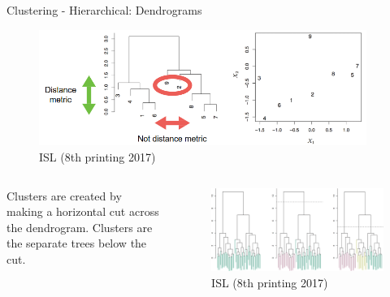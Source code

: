 \begin{frame}[allowframebreaks]{Clustering - Hierarchical: Dendrograms}
\begin{block}{}
    \vspace{1.5em}

    \begin{figure}
        \centering
        \includegraphics[width=0.95\textwidth,height=0.7\textheight,keepaspectratio]{images/dul/hierarchical/dendograms-distance-metric.png}
        \caption{ISL (8th printing 2017)}
    \end{figure}
\end{block}

\framebreak

\begin{columns}
    \begin{column}{0.45\textwidth}
        Clusters are created by  making a horizontal cut  across the dendrogram.  Clusters are the separate  trees below the cut.
    \end{column}

    \vspace{0.8em}

    \begin{column}{0.55\textwidth}
        \begin{figure}
            \centering
            \includegraphics[width=1.05\textwidth,height=0.8\textheight,keepaspectratio]{images/dul/hierarchical/dendrograms-cluster.png}
            \caption{ISL (8th printing 2017)}
        \end{figure}
    \end{column}
\end{columns}


\end{frame}
